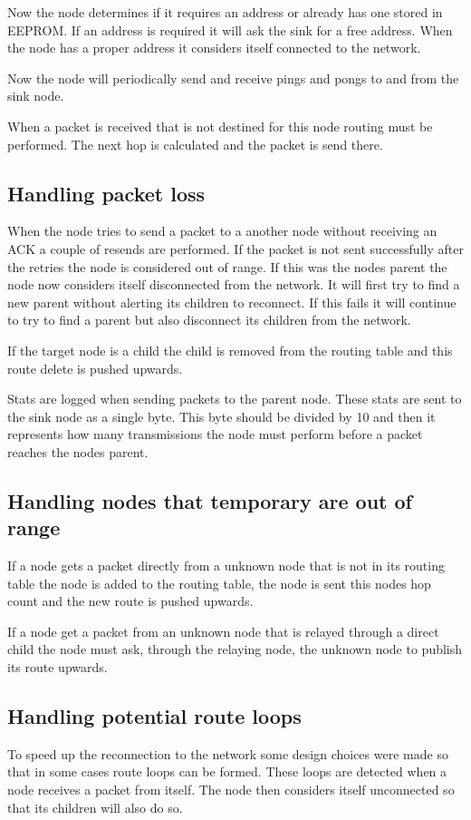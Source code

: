 \documentclass[a4paper,11pt]{article}
\begin{document}
Now the node determines if it requires an address or already has one
stored in EEPROM. If an address is required it will ask the sink for a
free address. When the node has a proper address it considers itself
connected to the network.

Now the node will periodically send and receive pings and pongs to and
from the sink node.

When a packet is received that is not destined for this node routing
must be performed. The next hop is calculated and the packet is send
there.

\subsection{Handling packet loss}
When the node tries to send a packet to a another node without
receiving an ACK a couple of resends are performed. If the packet is
not sent successfully after the retries the node is considered out of
range. If this was the nodes parent the node now considers itself
disconnected from the network. It will first try to find a new parent
without alerting its children to reconnect. If this fails it will
continue to try to find a parent but also disconnect its children from
the network.

If the target node is a child the child is removed from the routing
table and this route delete is pushed upwards.

Stats are logged when sending packets to the parent node. These stats
are sent to the sink node as a single byte. This byte should be
divided by 10 and then it represents how many transmissions the node
must perform before a packet reaches the nodes parent.

\subsection{Handling nodes that temporary are out of range}
If a node gets a packet directly from a unknown node that is not in
its routing table the node is added to the routing table, the node is
sent this nodes hop count and the new route is pushed upwards.

If a node get a packet from an unknown node that is relayed through a
direct child the node must ask, through the relaying node, the unknown
node to publish its route upwards.

\subsection{Handling potential route loops}
To speed up the reconnection to the network some design choices were
made so that in some cases route loops can be formed. These loops are
detected when a node receives a packet from itself. The node then
considers itself unconnected so that its children will also do so.
\end{document}
